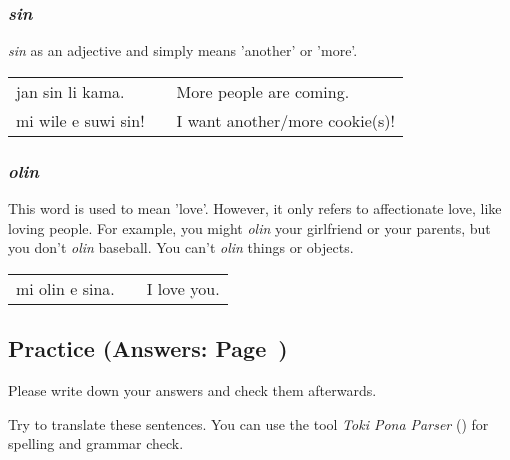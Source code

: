 %
\subsubsection*{\textit{sin}}
%
\textit{sin} as an adjective and simply means 'another' or 'more'. 

\begin{supertabular}{p{5,5cm}|ll}
jan sin li kama. && More people are coming. \\
mi wile e suwi sin! && I want another/more cookie(s)! \\
\end{supertabular} 

%
\subsubsection*{\textit{olin}}
%
This word is used to mean 'love'. 
However, it only refers to affectionate love, like loving people. 
For example, you might \textit{olin} your girlfriend or your parents, but you don't \textit{olin} baseball. 
You can't \textit{olin} things or objects. 

\begin{supertabular}{p{5,5cm}|ll}
mi olin e sina. && I love you. \\
\end{supertabular}  

%
%
\newpage
\subsection*{Practice (Answers: Page~\pageref{'questions_using_seme'})}
%
Please write down your answers and check them afterwards. 

Try to translate these sentences. 
You can use the tool \textit{Toki Pona Parser} (\cite{www:rowa:02}) for spelling and grammar check. 

